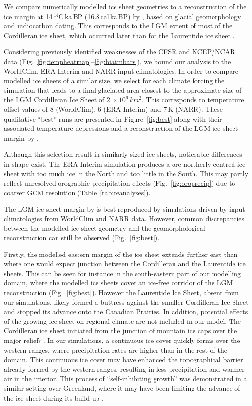 We compare numerically modelled ice sheet geometries to a reconstruction of the ice margin at 14\,$^{14}$C\,ka\,BP (16.8\,cal\,ka\,BP) by \citet{dyke-2004}, based on glacial geomorphology and radiocarbon dating. This corresponds to the LGM extent of most of the Cordilleran ice sheet, which occurred later than for the Laurentide ice sheet \citep{dyke-2004}.

Considering previously identified weaknesses of the CFSR and NCEP/NCAR data (Fig.~\ref{fig:tempheatmap}--\ref{fig:biatmbars}), we bound our analysis to the  WorldClim, ERA-Interim and NARR input climatologies. In order to compare modelled ice sheets of a similar size, we select for each climate forcing the simulation that leads to a final glaciated area closest to the approximate size of the LGM Cordilleran Ice Sheet of $2\,\times10^6\,\unit{km^2}$. This corresponds to temperature offset values of 8 (WorldClim), 6 (ERA-Interim) and 7\,K (NARR). These qualitative “best” runs are presented in Figure~\ref{fig:best} along with their associated temperature depressions and a reconstruction of the LGM ice sheet margin by \citet{dyke-2004}.

Although this selection result in similarly sized ice sheets, noticeable differences in shape exist. The ERA-Interim simulation produces a ore northerly-centred ice sheet with too much ice in the North and too little in the South. This may partly reflect unresolved orographic precipitation effects (Fig.~\ref{fig:oroprecip}) due to coarser GCM resolution (Table~\ref{tab:reanalyses}).

The LGM ice sheet margin by \citet{dyke-2004} is best reproduced by simulations driven by input climatologies from WorldClim and NARR data. However, common discrepancies between the modelled ice sheet geometry and the geomorphological reconstruction can still be observed (Fig.~\ref{fig:best}).

Firstly, the modelled eastern margin of the ice sheet extends further east than where one would expect junction between the Cordilleran and the Laurentide ice sheets. This can be seen for instance in the south-eastern part of our modelling domain, where the modelled ice sheets cover an ice-free corridor of the LGM reconstruction (Fig.~\ref{fig:best}). However the Laurentide Ice Sheet, absent from our simulations, likely formed a buttress against the smaller Cordilleran Ice Sheet and stopped its advance onto the Canadian Prairies. In addition, potential effects of the growing ice-sheet on regional climate are not included in our model. The Cordilleran ice sheet initiated from the junction of mountain ice caps over the major reliefs \citep{clague-1989}. In our simulations, a continuous ice cover quickly forms over the western ranges, where precipitation rates are higher than in the rest of the domain. This continuous ice cover may have enhanced the topographical barrier already formed by the western ranges, resulting in less precipitation and warmer air in the interior. This process of ``self-inhibiting growth'' was demonstrated in a similar setting over Greenland, where it may have been limiting the advance of the ice sheet during its build-up \citep{langen-etal-2012}.

